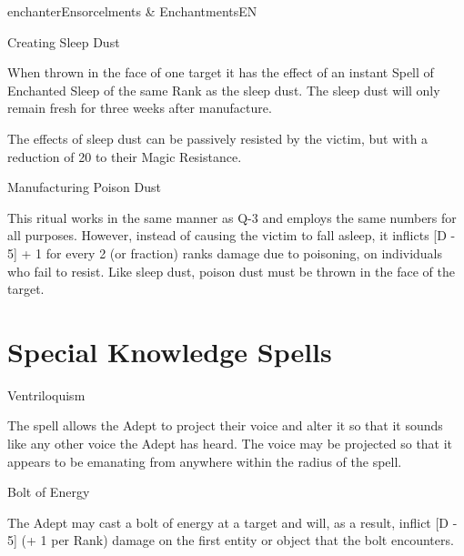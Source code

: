 \begin{College}[1.1]{enchanter}{Ensorcelments \& Enchantments}{EN}
\begin{ritual}[Q-3]{Creating Sleep Dust}
\begin{effects}
When thrown in the face of one target it has the effect of an instant
Spell of Enchanted Sleep of the same Rank as the sleep dust.  The
sleep dust will only remain fresh for three weeks after manufacture.

The effects of sleep dust can be passively resisted by the victim, but
with a reduction of 20 to their Magic Resistance.
\end{effects}
\end{ritual}

\begin{ritual}[Q-4]{Manufacturing Poison Dust}
\begin{effects}
This ritual works in the same manner as Q-3 and employs the same
numbers for all purposes.  However, instead of causing the victim to
fall asleep, it inflicts [D - 5] + 1 for every 2 (or fraction) ranks
damage due to poisoning, on individuals who fail to resist.  Like
sleep dust, poison dust must be thrown in the face of the target.
\end{effects}
\end{ritual}


\section{Special Knowledge Spells}


\begin{spell}[S-1]{Ventriloquism}
\begin{effects}
The spell allows the Adept to project their voice and alter it so that
it sounds like any other voice the Adept has heard. The voice may be
projected so that it appears to be emanating from anywhere within the
radius of the spell.
\end{effects}
\end{spell}

\begin{spell}[S-2]{Bolt of Energy}

\begin{effects}
The Adept may cast a bolt of energy at a target and will, as a result,
inflict [D - 5] (+ 1 per Rank) damage on the first entity or object
that the bolt encounters.
\end{effects}
\end{spell}


\end{College}
